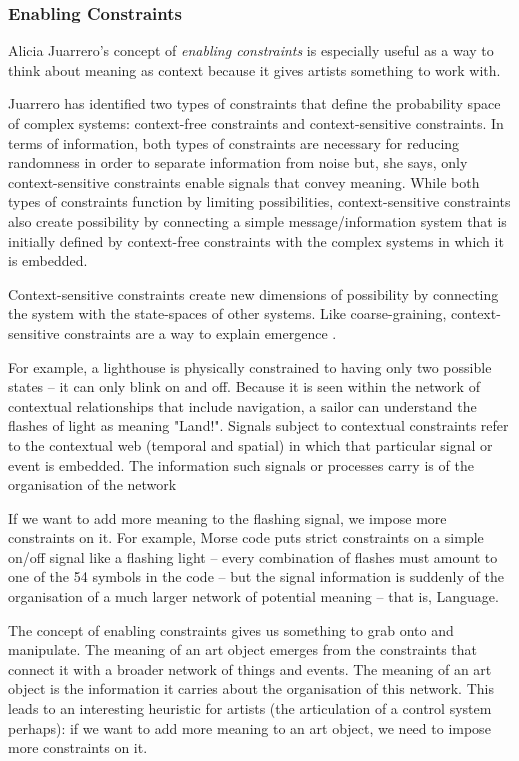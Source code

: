 \documentclass[letterpaper]{article}
\begin{document}
    \subsubsection{Enabling Constraints}

    Alicia Juarrero's concept of \emph{enabling constraints} is especially useful as a way to think about meaning as context because it gives artists something to work with.
    
    Juarrero has identified two types of constraints that define the probability space of complex systems: context-free constraints and context-sensitive constraints. In terms of information, both types of constraints are necessary for reducing randomness in order to separate information from noise but, she says, only context-sensitive constraints enable signals that convey meaning. While both types of constraints function by limiting possibilities, context-sensitive constraints also create possibility by connecting a simple message/information system that is initially defined by context-free constraints with the complex systems in which it is embedded.
    
    Context-sensitive constraints create new dimensions of possibility by connecting the system with the state-spaces of other systems. Like coarse-graining, context-sensitive constraints are a way to explain emergence \citep[p.193]{JuarreroThSlfOrgnstnOfIntntnlActn2004} \citep[p.240]{JuarreroCsltyAsCnstrnt1998}.

    For example, a lighthouse is physically constrained to having only two possible states – it can only blink on and off. Because it is seen within the network of contextual relationships that include navigation, a sailor can understand the flashes of light as meaning "Land!". Signals subject to contextual constraints refer to the contextual web (temporal and spatial) in which that particular signal or event is embedded. The information such signals or processes carry is of the organisation of the network \citep[p.237]{JuarreroCsltyAsCnstrnt1998}
    
    If we want to add more meaning to the flashing signal, we impose more constraints on it. For example, Morse code puts strict constraints on a simple on/off signal like a flashing light – every combination of flashes must amount to one of the 54 symbols in the code – but the signal information is suddenly of the organisation of a much larger network of potential meaning – that is, Language.

    The concept of enabling constraints gives us something to grab onto and manipulate. The meaning of an art object emerges from the constraints that connect it with a broader network of things and events. The meaning of an art object is the information it carries about the organisation of this network. This leads to an interesting heuristic for artists (the articulation of a control system perhaps): if we want to add more meaning to an art object, we need to impose more constraints on it.
\end{document}

